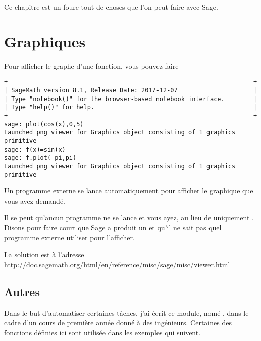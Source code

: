 
Ce chapitre est un foure-tout de choses que l'on peut faire avec Sage.

\section{Graphiques}

Pour afficher le graphe d'une fonction, vous pouvez faire
\begin{verbatim}
+--------------------------------------------------------------------+
| SageMath version 8.1, Release Date: 2017-12-07                     | 
| Type "notebook()" for the browser-based notebook interface.        | 
| Type "help()" for help.                                            |
+--------------------------------------------------------------------+
sage: plot(cos(x),0,5)
Launched png viewer for Graphics object consisting of 1 graphics primitive
sage: f(x)=sin(x)
sage: f.plot(-pi,pi)
Launched png viewer for Graphics object consisting of 1 graphics primitive
\end{verbatim}
Un programme externe se lance automatiquement pour afficher le graphique que vous avez demandé.

Il se peut qu'aucun programme ne se lance et vous ayez, au lieu de  uniquement . Disons pour faire court que Sage a produit un  et qu'il ne sait pas quel programme externe utiliser pour l'afficher.

La solution est à l'adresse \url{http://doc.sagemath.org/html/en/reference/misc/sage/misc/viewer.html}
\subsection{Autres}

Dans le but d'automatiser certaines tâches, j'ai écrit ce module, nomé , dans le cadre d'un cours de première année donné à des ingénieurs. Certaines des fonctions définies ici sont utilisée dans les exemples qui suivent.

